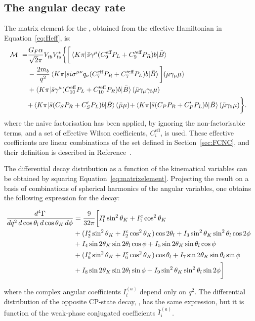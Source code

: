 \subsection{The angular decay rate}
\label{sec:decRate}

The matrix element for the \BtoKstmumudecay, obtained from the effective Hamiltonian in Equation~\ref{eq:Heff}, is:
\begin{equation}\label{eq:matrixelement}
  \begin{split}
    {\mathcal M}\ =& \frac{G_F\alpha}{\sqrt{2}\pi}V_{tb}^{}V_{ts}^*\bigg\{\bigg[ \braket{K \pi|\bar{s}\gamma^{\mu}({C_9^\text{eff}P_L+C_9^{\prime\text{eff}} P_R})b|\bar B} \\
      &-\frac{2m_b}{q^2}\braket{K\pi|\bar{s}i\sigma^{\mu\nu}q_{\nu}(C_7^\text{eff} P_R+C_7^{\prime\text{eff}}  P_L)b|\bar B}\bigg](\bar{\mu}\gamma_{\mu}\mu)\\
    &+ \braket{K\pi|\bar{s}\gamma^{\mu}({C_{10}^\text{eff} P_L+C_{10}^{\prime\text{eff}} P_R})b|\bar B}(\bar{\mu}\gamma_{\mu}\gamma_5 \mu) \\
    & {+\braket{K \pi|\bar{s} ({C_S P_R+C_S^\prime P_L}) b|\bar B}(\bar{\mu}\mu)}{+\braket{K \pi|\bar{s} ({C_P P_R+C_P^\prime P_L}) b|\bar B}(\bar{\mu}\gamma_5\mu)} \bigg \}.
  \end{split}
\end{equation}
where the naive factorisation has been applied, by ignoring the non-factorisable terms, and a set of effective Wilson coefficients, $C_{i}^\text{eff}$, is used.
These effective coefficients are linear combinations of the set defined in Section~\ref{sec:FCNC}, and their definition is described in Reference~\cite{Altmannshofer:2008dz}.

The differential decay distribution as a function of the kinematical variables can be obtained by squaring Equation~\ref{eq:matrixelement}.
Projecting the result on a basis of combinations of spherical harmonics of the angular variables, one obtains the following expression for the \BtoKstmumuconjdecay decay:
\begin{small}
  \begin{align} \label{eq:angulardist}
    \frac{d^4\Gamma}{dq^2\, d\cos\theta_l\, d\cos\theta_K\, d\phi} &=\frac{9}{32\pi}\bigg[ I_1^s\sin^2\theta_K + I_1^c\cos^2\theta_K \nonumber\\
      & + (I_2^s\sin^2\theta_K + I_2^c\cos^2\theta_K)\cos2\theta_l + I_3 \sin^2\theta_K \sin^2\theta_l \cos 2\phi \nonumber \\
      & + I_4 \sin 2\theta_K \sin 2\theta_l \cos\phi + I_5 \sin 2\theta_K \sin\theta_l \cos\phi \nonumber \\
      & + (I_6^s \sin^2\theta_K + {I_6^c \cos^2\theta_K})  \cos\theta_l + I_7 \sin 2\theta_K \sin\theta_l \sin\phi \nonumber \\
    & + I_8 \sin 2\theta_K \sin 2\theta_l \sin\phi + I_9 \sin^2\theta_K \sin^2\theta_l \sin 2\phi \bigg]
  \end{align}
\end{small}
where the complex angular coefficients $I_i^{(a)}$ depend only on $q^2$.
The differential distribution of the opposite CP-state decay, \BtoKstmumudecay, has the same expression, but it is function of the weak-phase conjugated coefficients $\bar{I}_i^{(a)}$.

